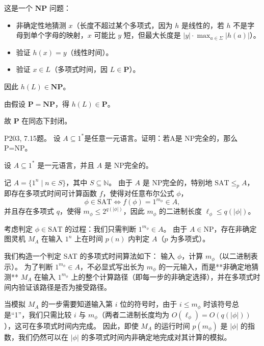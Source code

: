 \documentclass[11pt,addpoints,answers]{exam}
\begin{document}
\begin{questions}
\begin{solution}
    这是一个 $\mathbf{NP}$ 问题：
    \begin{itemize}
        \item 非确定性地猜测 $x$（长度不超过某个多项式，因为 $h$ 是线性的，若 $h$ 不是字母到单个字母的映射，$x$ 可能比 $y$ 短，但最大长度是 $|y| \cdot \max_{a \in \Sigma} |h(a)|$）。
        \item 验证 $h(x)=y$（线性时间）。
        \item 验证 $x \in L$（多项式时间，因 $L \in \mathbf{P}$）。
    \end{itemize}
    因此 $h(L) \in \mathbf{NP}$。
    
    由假设 $\mathbf{P} = \mathbf{NP}$，得 $h(L) \in \mathbf{P}$。
    
    故 $\mathbf{P}$ 在同态下封闭。

\end{solution}



\question P203, 7.15题。
设 $A\subseteq 1^*$是任意一元语言。证明：若A是 NP完全的，那么 P=NP。
\begin{solution}

	设 $A \subseteq 1^*$ 是一元语言，并且 $A$ 是 NP完全的。  

    记 $A = \{ 1^n \mid n \in S \}$，其中 $S \subseteq \mathbb{N}$。  
    由于 $A$ 是 NP完全的，特别地 $\text{SAT} \le_p A$，即存在多项式时间可计算函数 $f$，使得对任意布尔公式 $\phi$，
    \[
    \phi \in \text{SAT} \iff f(\phi) = 1^{m_\phi} \in A,
    \]
    并且存在多项式 $q$，使得 $m_\phi \le 2^{q(|\phi|)}$，因此 $m_\phi$ 的二进制长度 $\ell_\phi \le q(|\phi|)$。
    
    考虑判定 $\phi \in \text{SAT}$ 的过程：我们只需判断 $1^{m_\phi} \in A$。  
    由于 $A \in \text{NP}$，存在非确定图灵机 $M_A$ 在输入 $1^n$ 上在时间 $p(n)$ 内判定 $A$（$p$ 为多项式）。  
    
    我们构造一个判定 SAT 的多项式时间算法如下：  
    输入 $\phi$，计算 $m_\phi$（以二进制表示）。  
    为了判断 $1^{m_\phi} \in A$，不必显式写出长为 $m_\phi$ 的一元输入，而是**非确定地猜测** $M_A$ 在输入 $1^{m_\phi}$ 上的整个计算路径（即每一步的非确定选择），并在多项式时间内验证该路径是否为接受路径。
    
    当模拟 $M_A$ 的一步需要知道输入第 $i$ 位的符号时，由于 $i \le m_\phi$ 时该符号总是“1”，我们只需比较 $i$ 与 $m_\phi$（两者二进制长度均为 $O(\ell_\phi) = O(q(|\phi|))$），这可在多项式时间内完成。  
    因此，即使 $M_A$ 的运行时间 $p(m_\phi)$ 是 $|\phi|$ 的指数，我们仍然可以在 $|\phi|$ 的多项式时间内非确定地完成对其计算的模拟。  
    

\end{solution}
\end{questions}
\end{document}
